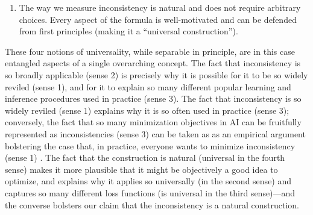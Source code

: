 \begin{enumerate}
\item 
The way we measure inconsistency is natural and does not require arbitrary choices. Every aspect of the formula is well-motivated and can be defended from first principles (making it a ``universal construction''). 
\end{enumerate} 


These four notions of universality, while separable in principle, are in this case entangled aspects of a single overarching concept.
The fact that inconsistency is so broadly applicable (sense 2) is precisely why it is possible for it to be so widely reviled (sense 1), and for it to explain so many different popular learning and inference procedures used in practice (sense 3). 
The fact that inconsistency is so widely reviled (sense 1) explains why it is so often used in practice (sense 3);
conversely, the fact that so many minimization objectives in AI can be fruitfully represented as inconsistencies
(sense 3)
can be taken as as an empirical argument bolstering the case that, in practice, everyone wants to minimize inconsistency (sense 1)
\unskip. 
The fact that the construction is natural (universal in the fourth sense) makes it more plausible that it might be objectively a good idea to optimize, and explains why it applies so universally (in the second sense) and captures so many different loss functions (is universal in the third sense)---and the converse bolsters our claim that the inconsistency is a natural construction. 


